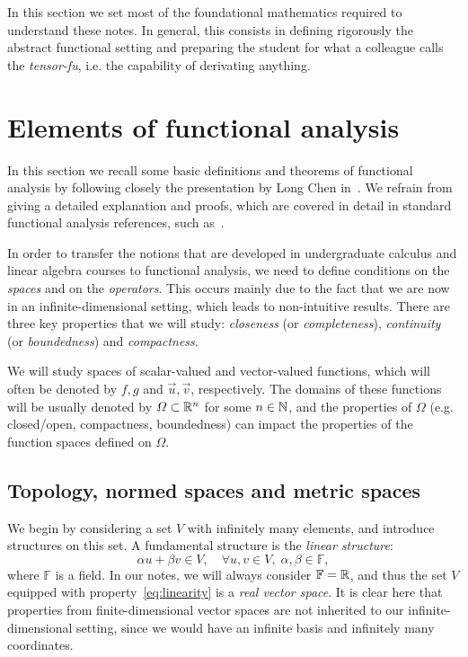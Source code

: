 In this section we set most of the foundational mathematics required to understand these notes. In general, this consists in defining rigorously the abstract functional setting and preparing the student for what a colleague calls the \emph{tensor-fu}, i.e. the capability of derivating anything.

\section{Elements of functional analysis}\label{sec:elements-functional-analysis}
In this section we recall some basic definitions and theorems of functional analysis by following closely the presentation by Long Chen in~\cite{chen2024infSup}. We refrain from giving a detailed explanation and proofs, which are covered in detail in standard functional analysis references, such as~\cite{BrezisFA}.

In order to transfer the notions that are developed in undergraduate calculus and linear algebra courses to functional analysis, we need to define conditions on the \emph{spaces} and on the \emph{operators}. This occurs mainly due to the fact that we are now in an infinite-dimensional setting, which leads to non-intuitive results. There are three key properties that we will study: \emph{closeness} (or \emph{completeness}), \emph{continuity} (or \emph{boundedness}) and \emph{compactness}.

We will study spaces of scalar-valued and vector-valued functions, which will often be denoted by $f, g$ and $\vec u, \vec v$, respectively. The domains of these functions will be usually denoted by $\Omega\subset\mathbb{R}^n$ for some $n\in\mathbb{N}$, and the properties of $\Omega$ (e.g. closed/open, compactness, boundedness) can impact the properties of the function spaces defined on $\Omega$.

\subsection{Topology, normed spaces and metric spaces}
We begin by considering a set $V$ with infinitely many elements, and introduce structures on this set. A fundamental structure is the \emph{linear structure}:
\begin{equation}\label{eq:linearity}
    \alpha u + \beta v \in V,\quad \forall u,v\in V, \; \alpha, \beta\in \mathbb{F},
\end{equation}
where $\mathbb{F}$ is a field. In our notes, we will always consider $\mathbb{F}=\mathbb{R}$, and thus the set $V$ equipped with property~\eqref{eq:linearity} is a \emph{real vector space}. It is clear here that properties from finite-dimensional vector spaces are not inherited to our infinite-dimensional setting, since we would have an infinite basis and infinitely many coordinates. 

